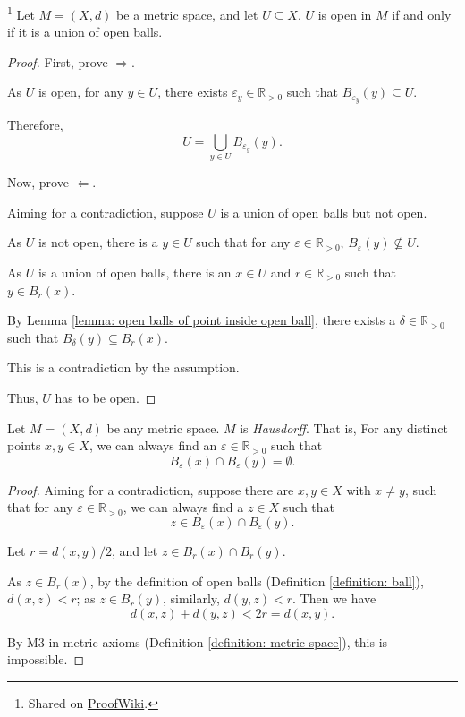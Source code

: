 \begin{theorem}
	\footnote{
		Shared on \href{https://proofwiki.org/wiki/Set_is_Open_iff_Union_of_Open_Balls}{ProofWiki}.
	}
	Let $M = (X, d)$ be a metric space, and let $U \subseteq X$. $U$ is open in $M$ if and only if it is a union of open balls.
	
	\begin{proof}
		First, prove $\Rightarrow$.
		
		As $U$ is open, for any $y \in U$, there exists $\varepsilon_y \in \mathbb R_{> 0}$ such that $B_{\varepsilon_y}(y) \subseteq U$.
		
		Therefore,
		$$
		U = \bigcup_{y \in U} B_{\varepsilon_y} (y).
		$$
		
		\qedlemma
		
		Now, prove $\Leftarrow$.
		
		Aiming for a contradiction, suppose $U$ is a union of open balls but not open.
		
		As $U$ is not open, there is a $y \in U$ such that for any $\varepsilon \in \mathbb R_{> 0}$, $B_\varepsilon (y) \not \subseteq U$.
		
		As $U$ is a union of open balls, there is an $x \in U$ and $r \in \mathbb R_{> 0}$ such that $y \in B_r (x)$.
		
		By Lemma \ref{lemma: open balls of point inside open ball}, there exists a $\delta \in \mathbb R_{> 0}$ such that $B_\delta (y) \subseteq B_r (x)$.
		
		This is a contradiction by the assumption.
		
		Thus, $U$ has to be open.
	\end{proof}
\end{theorem}


\begin{theorem}
	Let $M = (X, d)$ be any metric space. $M$ is \textit{Hausdorff}. That is, For any distinct points $x,y \in X$, we can always find an $\varepsilon \in \mathbb R_{> 0}$ such that
	$$
	B_\varepsilon(x) \cap B_\varepsilon(y) = \emptyset.
	$$
	
	\begin{proof}
		Aiming for a contradiction, suppose there are $x,y \in X$ with $x \ne y$, such that for any $\varepsilon \in \mathbb R_{> 0}$, we can always find a $z \in X$ such that
		$$
		z \in B_\varepsilon(x) \cap B_\varepsilon(y).
		$$
		
		Let $r = d(x,y)/2$, and let $z \in B_r(x) \cap B_r(y)$.
		
		As $z \in B_r(x)$, by the definition of open balls (Definition \ref{definition: ball}), $d(x,z) < r$; as $z \in B_r(y)$, similarly, $d(y,z)< r$. Then we have
		$$
		d(x, z) + d(y, z) < 2r = d(x,y).
		$$
		
		By M3 in metric axioms (Definition \ref{definition: metric space}), this is impossible.
	\end{proof}
\end{theorem}


